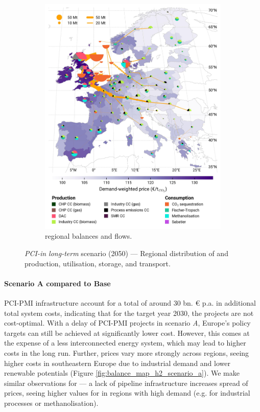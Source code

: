 \documentclass[preprint,12pt,sort&compress]{elsarticle}
\begin{document}
\begin{figure}[htbp]
\begin{subfigure}[t]{0.49\textwidth}
      \includegraphics[width=1\textwidth]{maps/pcipmi-national-international-expansion/base_s_adm___2050-balance_map_co2_stored} 
      \vspace{-0.7cm}
      \caption{ regional balances and flows.}
      \label{fig:PCI-in_lt_2050_co2}
  \end{subfigure}
  \caption{\textit{PCI-in long-term} scenario (2050) --- Regional distribution of  and  production, utilisation, storage, and transport.}
  \label{fig:PCI-in_lt_2050}
\end{figure}

\paragraph{Scenario A compared to Base} PCI-PMI infrastructure account for a total of around 30 bn. \euro{} p.a. in additional total system costs, indicating that for the target year 2030, the projects are not cost-optimal. With a delay of PCI-PMI projects in scenario \textit{A}, Europe's policy targets can still be achieved at significantly lower cost. However, this comes at the expense of a less interconnected energy system, which may lead to higher costs in the long run. Further,  prices vary more strongly across regions, seeing higher costs in southeastern Europe due to industrial demand and lower renewable potentials (Figure \ref{fig:balance_map_h2_scenario_a}). We make similar observations for  --- a lack of pipeline infrastructure increases spread of  prices, seeing higher values for  in regions with high demand (e.g. for industrial processes or methanolisation). 
\end{document}

